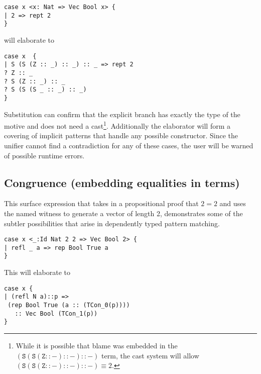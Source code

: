 \begin{lstlisting}[basicstyle={\ttfamily\small}]
case x <x: Nat => Vec Bool x> {
| 2 => rept 2
}
\end{lstlisting}
 
will elaborate to
\begin{lstlisting}[basicstyle={\ttfamily\small}]
case x  {
| S (S (Z :: _) :: _) :: _ => rept 2
? Z :: _
? S (Z :: _) :: _
? S (S (S _ :: _) :: _)
}
\end{lstlisting}
 
Substitution can confirm that the explicit branch has exactly the type of the motive and does not need a cast\footnote{
  While it is possible that blame was embedded in the $\mathtt{(S (S (Z :: -) :: -) :: -)}$ term, the cast system will allow $\mathtt{(S (S (Z :: -) :: -) :: -)}\equiv2$.}.
Additionally the elaborator will form a covering of implicit patterns that handle any possible constructor.
Since the unifier cannot find a contradiction for any of these cases, the user will be warned of possible runtime errors.
 
\subsection{Congruence (embedding equalities in terms)}
This surface expression that takes in a propositional proof that $2=2$ and uses the named witness to generate a vector of length 2, demonstrates some of the subtler possibilities that arise in dependently typed pattern matching.

\begin{lstlisting}[basicstyle={\ttfamily\small}]
case x <_:Id Nat 2 2 => Vec Bool 2> {
| refl _ a => rep Bool True a
}
\end{lstlisting}
 
This will elaborate to
 
\begin{lstlisting}[basicstyle={\ttfamily\small}]
case x {
| (refl N a)::p =>
 (rep Bool True (a :: (TCon_0(p)))) 
   :: Vec Bool (TCon_1(p))
}
\end{lstlisting}

